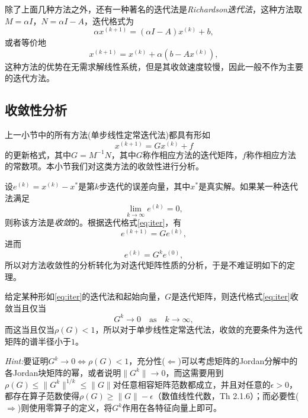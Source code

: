 \documentclass[a4paper,10pt]{ctexart}
\begin{document}
除了上面几种方法之外，还有一种著名的迭代法是\emph{Richardson迭代法}，这种方法取$ M=\alpha I $，$ N=\alpha I - A $，迭代格式为
\[
    \alpha x^{(k+1)} = (\alpha I - A)x^{(k)} + b,
\]
或者等价地
\[
    x^{(k+1)} = x^{(k)} + \alpha (b - Ax^{(k)}),
\]
这种方法的优势在无需求解线性系统，但是其收敛速度较慢，因此一般不作为主要的迭代方法。

\subsection{收敛性分析}
上一小节中的所有方法(单步线性定常迭代法)都具有形如
\begin{equation}\label{eq:iter}
    x^{(k+1)} = Gx^{(k)} + f
\end{equation}
的更新格式，其中$ G = M^{-1}N $，其中$ G $称作相应方法的迭代矩阵，$ f $称作相应方法的常数项。本小节我们对这类方法的收敛性进行分析。

设$ e^{(k)} = x^{(k)} - x^* $是第$ k $步迭代的误差向量，其中$ x^* $是真实解。如果某一种迭代法满足
\[
    \lim_{k\to\infty} e^{(k)} = 0,
\]
则称该方法是\emph{收敛}的。根据迭代格式\eqref{eq:iter}，有
\[
    e^{(k+1)} = Ge^{(k)},
\]
进而
\[
    e^{(k)} = G^k e^{(0)},
\]
所以对方法收敛性的分析转化为对迭代矩阵性质的分析，于是不难证明如下的定理。
\begin{theorem}
    给定某种形如\eqref{eq:iter}的迭代法和起始向量，$ G $是迭代矩阵，则迭代格式\eqref{eq:iter}收敛当且仅当
    \[
        G^k \to 0 \quad \text{as} \quad k\to\infty,
    \]
    而这当且仅当$ \rho(G)<1 $，所以对于单步线性定常迭代法，收敛的充要条件为迭代矩阵的谱半径小于$ 1 $。
\end{theorem}
\noindent \emph{Hint:}要证明$ G^k\to 0\iff \rho(G)<1 $，充分性($ \Leftarrow  $)可以考虑矩阵的Jordan分解中的各Jordan块矩阵的幂，或者说明$ \| G^k \| \to 0 $，而这需要用到$ \rho(G)\leqslant \| G^k \|^{1 / k}\leqslant \| G \| $对任意相容矩阵范数都成立，并且对任意的$ \epsilon>0 $，都存在算子范数使得$ \rho(G)\geqslant \| G \| -\epsilon $（数值线性代数，Th 2.1.6）；而必要性($ \Rightarrow  $)则使用零算子的定义，将$ G^k $作用在各特征向量上即可。
\end{document}

